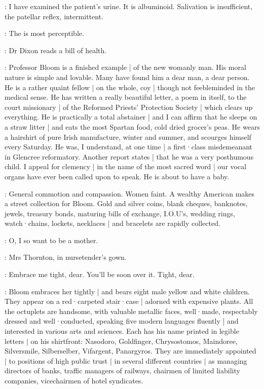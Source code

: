 \DrCrotthers[2]:
I have examined the patient's urine.
It is albuminoid.
Salivation is insufficient,
the patellar reflex,
intermittent.

\DrPunchCostello[2]:
The 
is most perceptible.

:
Dr Dixon reads a bill of health.

\DrDixon:
Professor Bloom is a finished example |
of the new womanly man.
His moral nature is simple and lovable.
Many have found him a dear man,
a dear person.
He is a rather quaint fellow |
on the whole,
coy |
though not feebleminded in the medical sense.
He has written a really beautiful letter,
a poem in itself,
to the court missionary |
of the Reformed Priests' Protection Society |
which clears up everything.
He is practically a total abstainer |
and I can affirm that he sleeps on a straw litter |
and eats the most Spartan food,
cold dried grocer's peas.
He wears a hairshirt of pure Irish manufacture,
winter and summer,
and scourges himself every Saturday.
He was,
I understand,
at one time |
a first·class misdemeanant in Glencree reformatory.
Another report states |
that he was a very posthumous child.
I appeal for clemency |
in the name of the most sacred word |
our vocal organs have ever been called upon to speak.
He is about to have a baby.

:
General commotion and compassion.
Women faint.
A wealthy American makes a street collection for Bloom.
Gold and silver coins,
blank cheques,
banknotes,
jewels,
treasury bonds,
maturing bills of exchange,
I.O.U's,
wedding rings,
watch·chains,
lockets,
necklaces |
and bracelets are rapidly collected.

\Bloom:
O,
I so want to be a mother.

:
Mrs Thornton,
in nursetender's gown.

\MrsThornton:
Embrace me tight,
dear.
You'll be soon over it.
Tight,
dear.%

:
Bloom embraces her tightly |
and bears eight male yellow and white children.
They appear on a red·carpeted stair·case |
adorned with expensive plants.
All the octuplets are handsome,
with valuable metallic faces,
well·made,
respectably dressed and well·conducted,
speaking five modern languages fluently |
and interested in various arts and sciences.
Each has his name printed in legible letters |
on his shirtfront:
Nasodoro,
Goldfinger,
Chrysostomos,
Maindoree,
Silversmile,
Silberselber,
Vifargent,
Panargyros.
They are immediately appointed |
to positions of high public trust |
in several different countries |
as managing directors of banks,
traffic managers of railways,
chairmen of limited liability companies,
vicechairmen of hotel syndicates.

